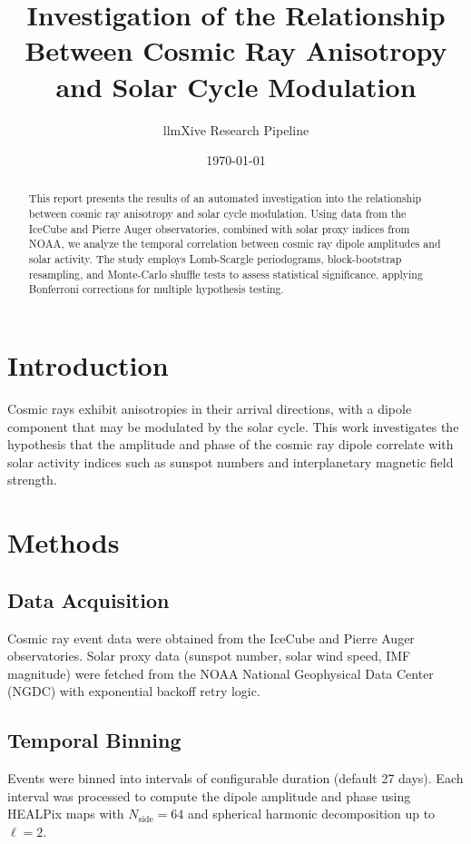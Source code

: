 \documentclass[11pt,a4paper]{article}
\title{Investigation of the Relationship Between Cosmic Ray Anisotropy and Solar Cycle Modulation}
\author{llmXive Research Pipeline}
\date{\today}
\begin{document}
\maketitle

\begin{abstract}
This report presents the results of an automated investigation into the relationship between cosmic ray anisotropy and solar cycle modulation. Using data from the IceCube and Pierre Auger observatories, combined with solar proxy indices from NOAA, we analyze the temporal correlation between cosmic ray dipole amplitudes and solar activity. The study employs Lomb-Scargle periodograms, block-bootstrap resampling, and Monte-Carlo shuffle tests to assess statistical significance, applying Bonferroni corrections for multiple hypothesis testing.
\end{abstract}

\section{Introduction}
Cosmic rays exhibit anisotropies in their arrival directions, with a dipole component that may be modulated by the solar cycle. This work investigates the hypothesis that the amplitude and phase of the cosmic ray dipole correlate with solar activity indices such as sunspot numbers and interplanetary magnetic field strength.

\section{Methods}
\subsection{Data Acquisition}
Cosmic ray event data were obtained from the IceCube and Pierre Auger observatories. Solar proxy data (sunspot number, solar wind speed, IMF magnitude) were fetched from the NOAA National Geophysical Data Center (NGDC) with exponential backoff retry logic.

\subsection{Temporal Binning}
Events were binned into intervals of configurable duration (default 27 days). Each interval was processed to compute the dipole amplitude and phase using HEALPix maps with $N_{\text{side}}=64$ and spherical harmonic decomposition up to $\ell=2$.
\end{document}
